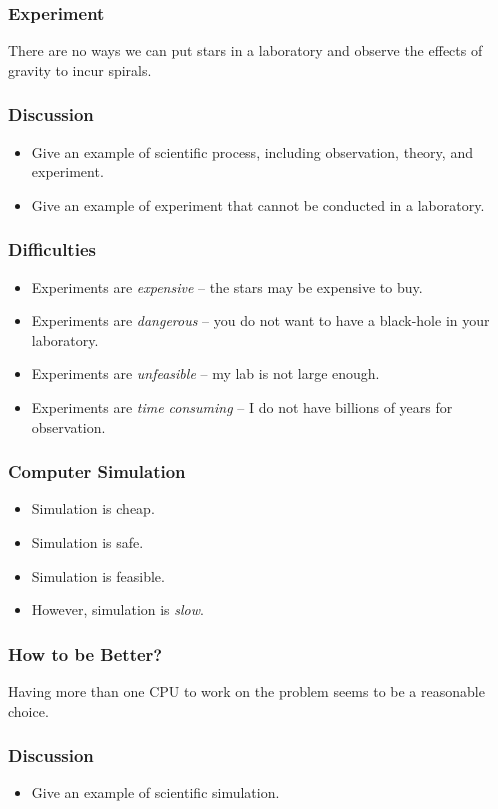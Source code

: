 \documentclass{beamer}
\begin{document}
\begin{CJK}{UTF8}{bsmi}
  \begin{frame}
    \frametitle{Experiment} \Huge There are no ways we can put stars in a
    laboratory and observe the effects of gravity to incur spirals.
  \end{frame}

  \begin{frame}
    \frametitle{Discussion} 
    \begin{itemize}
    \item Give an example of scientific process, including observation,
      theory, and experiment.
    \item Give an example of experiment that cannot be conducted in a
      laboratory.
    \end{itemize}
  \end{frame}

  \begin{frame}
    \frametitle{Difficulties} 
    \begin{itemize}
    \item Experiments are {\em expensive} -- the stars may be expensive to
      buy.
    \item Experiments are {\em dangerous} -- you do not want to have a
      black-hole in your laboratory.
    \item Experiments are {\em unfeasible} -- my lab is not large enough.
    \item Experiments are {\em time consuming} -- I do not have billions
      of years for observation.
    \end{itemize}
  \end{frame}

  \begin{frame}
    \frametitle{Computer Simulation} 
    \begin{itemize}
    \item Simulation is cheap.
    \item Simulation is safe.
    \item Simulation is feasible.
    \item However, simulation is {\em slow}.
    \end{itemize}
  \end{frame}

  \begin{frame}
    \frametitle{How to be Better?}
    \Huge Having more than one CPU to work on the problem seems to be a
    reasonable choice.
  \end{frame}


  \begin{frame}
    \frametitle{Discussion} 
    \begin{itemize}
    \item Give an example of scientific simulation.
    \end{itemize}
  \end{frame}


\end{CJK}
\end{document}
